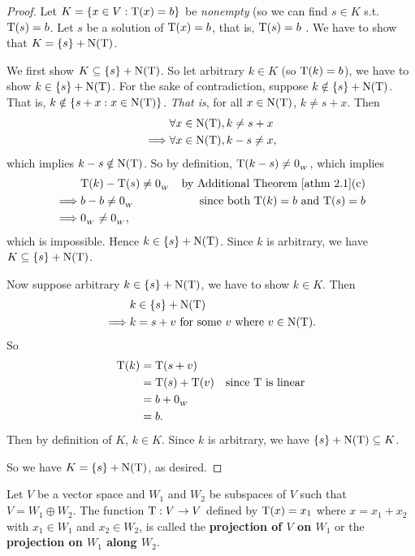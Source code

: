 \begin{proof}
Let \(K = \{ x \in V : \mathrm{T}(x) = b \}\) be \emph{nonempty} (so we can find \(s \in K\) s.t. \(\mathrm{T}(s) = b\).
Let \(s\) be a solution of \(\mathrm{T}(x) = b\), that is, \(\mathrm{T}(s) = b\) .
We have to show that \(K = \{ s \} + \mathrm{N(T)}\).

We first show \(K \subseteq \{ s \} + \mathrm{N(T)}\).
So let arbitrary \(k \in K\) (so \(\mathrm{T}(k) = b\)), we have to show \(k \in \{ s \} + \mathrm{N(T)}\).
For the sake of contradiction, suppose \(k \notin \{ s \} + \mathrm{N(T)}\).
That is, \(k \notin \{ s + x : x \in \mathrm{N(T)} \}\).
\emph{That is}, for all \(x \in \mathrm{N(T)}\), \(k \ne s + x\).
Then
\begin{align*}
             & \forall x \in \mathrm{N(T)}, k \ne s + x \\
    \implies & \forall x \in \mathrm{N(T)}, k - s \ne x,
\end{align*}
which implies \(k - s \notin \mathrm{N(T)}\).
So by definition, \(\mathrm{T}(k - s) \ne 0_{_W}\), which implies 
\begin{align*}
             & \T(k) - \T(s) \ne \OW & \text{by \ATHM{2.1}(c)} \\
    \implies & b - b \ne \OW & \text{since both \(\T(k) = b\) and \(\T(s) = b\)} \\
    \implies & \OW \ne \OW,
\end{align*}
which is impossible.
Hence \(k \in \{ s \} + \mathrm{N(T)}\).
Since \(k\) is arbitrary, we have \(K \subseteq \{ s \} + \mathrm{N(T)}\).

Now suppose arbitrary \(k \in \{ s \} + \mathrm{N(T)}\), we have to show \(k \in K\).
Then
\begin{align*}
             & k \in \{ s \} + \mathrm{N(T)} \\
    \implies & k = s + v \text{ for some \(v\) where } v \in \mathrm{N(T)}.
\end{align*}
So
\begin{align*}
    \mathrm{T}(k) & = \mathrm{T}(s + v) \\
          & = \mathrm{T}(s) + \mathrm{T}(v) & \text{since \(\mathrm{T}\) is linear} \\
          & = b + 0_{_W} \\
          & = b.
\end{align*}
Then by definition of \(K\), \(k \in K\).
Since \(k\) is arbitrary, we have \(\{ s \} + \mathrm{N(T)} \subseteq K\).

So we have \(K = \{ s \} + \mathrm{N(T)}\), as desired.
\end{proof}

\begin{additional definition} \label{adef 2.2}
Let \(V\) be a vector space and \(W_1\) and \(W_2\) be subspaces of \(V\) such that \(V = W_1 \oplus W_2\).
The function \(\mathrm{T} : V \to V\) defined by \(\mathrm{T}(x) = x_1\) where \(x = x_1 + x_2\) with \(x_1 \in W_1\) and \(x_2 \in W_2\), is called the \textbf{projection of \(V\) on \(W_1\)} or the \textbf{projection on \(W_1\) along \(W_2\)}.
\end{additional definition}

